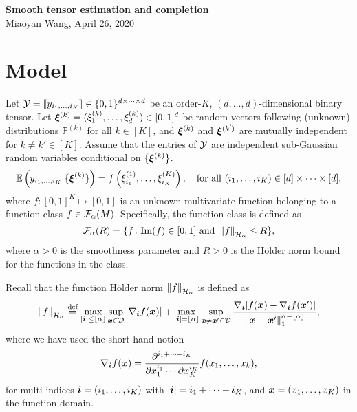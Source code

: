 \documentclass[11pt]{article}
\theoremstyle{plain}
\theoremstyle{definition}
\newcommand{\Hnorm}[1]{\left\lVert#1\right\rVert_{\tH_\alpha}}
\begin{document}
\begin{center}
{\bf \Large Smooth tensor estimation and completion}\\
Miaoyan Wang, April 26, 2020
\end{center}
\section{Model}

Let $\mathcal{Y}=\llbracket y_{i_1,\ldots,i_K} \rrbracket\in\{0,1\}^{d \times \cdots \times d}$ be an order-$K$, $(d,\ldots,d)$-dimensional binary tensor. Let $\boldsymbol{\xi}^{(k)}=(\xi^{(k)}_1,\ldots,\xi^{(k)}_d)\in[0,1]^d$ be random vectors following (unknown) distributions $\mathbb{P}^{(k)}$ for all $k\in[K]$, and $\boldsymbol{\xi}^{(k)}$ and $\boldsymbol{\xi}^{(k')}$ are mutually independent for $k\neq k' \in[K]$. Assume that the entries of $\mathcal{Y}$ are independent sub-Gaussian random variables conditional on $\{\boldsymbol{\xi}^{(k)}\}$.
\[
\mathbb{E}\left(y_{i_1,\ldots,i_K}|\{\boldsymbol{\xi}^{(k)}\}\right)=f\left(\xi^{(1)}_{i_1},\ldots,\xi^{(K)}_{i_K}\right),\quad \text{for all } (i_1,\ldots,i_K)\in[d]\times \cdots \times [d],
\]
where $f\colon [0,1]^K\mapsto [0,1]$ is an unknown multivariate function belonging to a function class $f\in \mathcal{F}_\alpha(M)$. Specifically, the function class is defined as
 \[ 
\tF_\alpha(R)=\{f\colon \text{Im}(f)\in[0,1]\ \text{and}\ \Hnorm{f}\leq R\},
\]
where $\alpha>0$ is the smoothness parameter and $R>0$ is the H\"{o}lder norm bound for the functions in the class. 

Recall that the function H\"{o}lder norm $\Hnorm{f}$ is defined as
\[
\Hnorm{f}\stackrel{\text{def}}{=}\max_{|\mi|\leq \lfloor \alpha \rfloor}\sup_{\mx \in \tD} |\nabla_{\mi} f(\mx)|+\max_{|\mi| =\lfloor \alpha \rfloor}\sup_{\mx\neq \mx' \in \tD} {\nabla_{\mi} |f(\mx)-\nabla_{\mi} f(\mx')|\over \onenorm{\mx-\mx'}^{\alpha-\lfloor \alpha \rfloor}},
\]
where we have used the short-hand notion
\[
 \nabla_{\bm{i}} f(\bm x) ={\partial^{i_1+\cdots+i_K}\over \partial x^{i_1}_1\cdots \partial x^{i_K}_K} f(x_1,\ldots,x_k),
\]
for multi-indices $\bm{i}=(i_1,\ldots,i_K)$ with $|\bm{i}|=i_1+\cdots+i_K$, and $\bm x=(x_1,\ldots,x_K)$ in the function domain.
\end{document}
